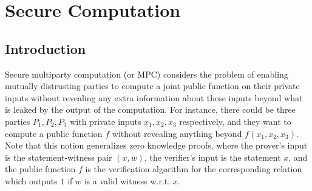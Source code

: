 \newcommand{\Sim}{\mathsf{Sim}}


\newcommand{\out}{\mathsf{out}}
\newcommand{\Assign}{:=}

\chapter{Secure Computation}

\section{Introduction}
Secure multiparty computation (or MPC) considers the problem of enabling mutually distrusting parties
to compute a joint public function on their private inputs without revealing
any extra information about these inputs beyond what is leaked by the output
of the computation.
For instance, there could be three parties $P_1, P_2, P_3$ with private inputs $x_1, x_2, x_3$ respectively, and they want to compute a public function $f$ without revealing anything beyond $f(x_1, x_2, x_3)$.
Note that this notion generalizes zero knowledge proofs, where the prover's input is the statement-witness pair $(x, w)$, the verifier's input is the statement $x$, and the public function $f$ is the verification algorithm for the corresponding relation which outputs $1$ if $w$ is a valid witness w.r.t. $x$.

